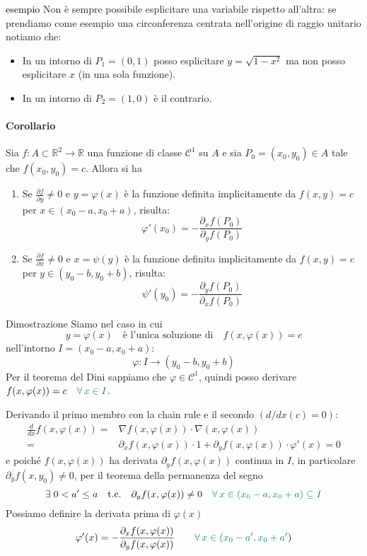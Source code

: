 \documentclass[x11names]{article}
\begin{document}
	\begin{es}{\textcolor{black}{esempio}}
		Non è sempre possibile esplicitare una variabile rispetto all'altra: se prendiamo come esempio una circonferenza centrata nell'origine di raggio unitario notiamo che:
		\begin{itemize}
			\item In un intorno di \(P_{1} = (0,1)\) posso esplicitare \(y = \sqrt{1 - x^2}\) ma non posso esplicitare \(x\) (in una sola funzione).
			\item In un intorno di \(P_{2} = (1,0)\) è il contrario.
		\end{itemize}
	\end{es}
	
	\paragraph{Corollario} Sia \(f:A \subset \mathbb{R}^2 \to \mathbb{R}\) una funzione di classe \(\mathcal{C}^1\) su \(A\) e sia \(P_0 = (x_0,y_0) \in A\) tale che \(f(x_0,y_0)=c\). Allora si ha
	\begin{enumerate}
		\item Se \(\frac{\partial f}{\partial y} \neq 0\) e \(y=\varphi(x)\) è la funzione definita implicitamente da \(f(x,y) = c\) per \(x \in (x_{0}-a,x_{0} +a)\), risulta:
		\[ 
		\varphi'(x_{0}) = -\frac{\partial_xf(P_{0})}{\partial_{y}f(P_{0})}
		\]
		\item Se \(\frac{\partial f}{\partial x} \neq 0\) e \(x=\psi(y)\) è la funzione definita implicitamente da \(f(x,y) = c\) per \(y \in (y_{0}-b,y_{0} +b)\), risulta:
		\[ 
		\psi'(y_{0}) = -\frac{\partial_yf(P_{0})}{\partial_{x}f(P_{0})}
		\]
	\end{enumerate}
	\begin{es}{Dimostrazione}
		Siamo nel caso in cui
		\[ 
		y=\varphi(x) \quad \text{è l'unica soluzione di}\quad f(x,\varphi(x)) = c
		\]
		nell'intorno \(I = (x_{0}-a,x_{0}+a)\):
		\[ 
		\varphi : I \to (y_{0}-b,y_{0}+b)
		\]
		Per il teorema del Dini sappiamo che \(\varphi \in \mathcal{C}^1\), quindi posso derivare \(f(x,\varphi(x)) = c \quad {\color{CadmiumGreen}\forall \,x \in I}\).
		
		Derivando il primo membro con la chain rule e il secondo \((d/dx(c) = 0)\):
		\begin{align*}
			\frac{d}{dx}f(x,\varphi(x)) =& \nabla f(x,\varphi(x)) \cdot \nabla(x,\varphi(x)) \\
			=& \partial_xf(x,\varphi(x))\cdot 1 + \partial_yf(x,\varphi(x))\cdot \varphi'(x) = 0
		\end{align*}
		e poiché \(f(x,\varphi(x))\) ha derivata \(\partial_{y}f(x,\varphi(x))\) continua in \(I\), in particolare \(\partial_{y}f(x,y_{0}) \neq 0\), per il teorema della permanenza del segno 
		\[ 
		\exists\;0<a'\leq a \quad \text{t.c.} \quad \partial_{y}f(x,\varphi(x)) \neq 0 \quad {\color{CadmiumGreen}\forall \,x \in (x_{0} - a, x_{0} + a) \subseteq I}
		\]
		Possiamo definire la derivata prima di \(\varphi(x)\)
		\[ 
		\varphi'(x) = -\frac{\partial_xf(x,\varphi(x))}{\partial_{y}f(x,\varphi(x))} \qquad {\color{CadmiumGreen}\forall \,x \in (x_{0} -a',x_{0}+ a'})
		\]
	\end{es}
	
\end{document}
